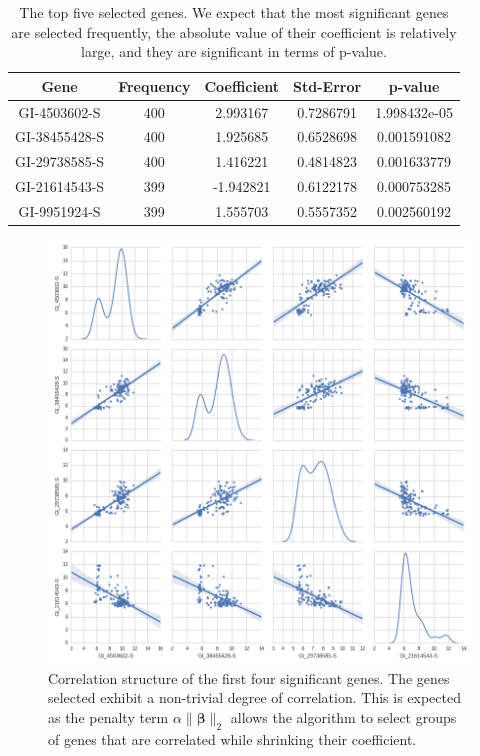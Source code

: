 \documentclass[12pt,a4paper]{article}
\begin{document}
\begin{table}
\begin{center}
\begin{tabular}{|c|c|c|c|c|}
\hline Gene & Frequency & Coefficient & Std-Error & p-value\\
\hline GI-4503602-S & 400 & 2.993167 & 0.7286791 & 1.998432e-05\\
\hline GI-38455428-S & 400 & 1.925685 & 0.6528698 & 0.001591082\\
\hline GI-29738585-S & 400 & 1.416221 & 0.4814823 & 0.001633779\\
\hline GI-21614543-S & 399 & -1.942821 & 0.6122178 & 0.000753285\\
\hline GI-9951924-S & 399 & 1.555703 & 0.5557352 & 0.002560192\\
\hline
\end{tabular}
\caption{The top five selected genes. We expect that the most significant genes are selected frequently, the absolute value of their coefficient is relatively large, and they are significant in terms of p-value.}
\label{table:2}
\end{center}
\end{table}

\begin{figure}[ht!]
\begin{center}
\includegraphics[scale=.4]{snscorr.png}
\caption{Correlation structure of the first four significant genes. The genes selected exhibit a non-trivial degree of correlation. This is expected as the  penalty term $\alpha \|\boldsymbol{\beta}\|_2$ allows the algorithm to select groups of genes that are correlated while shrinking their coefficient.}
\label{fig:2}
\end{center}
\end{figure}
\end{document}
